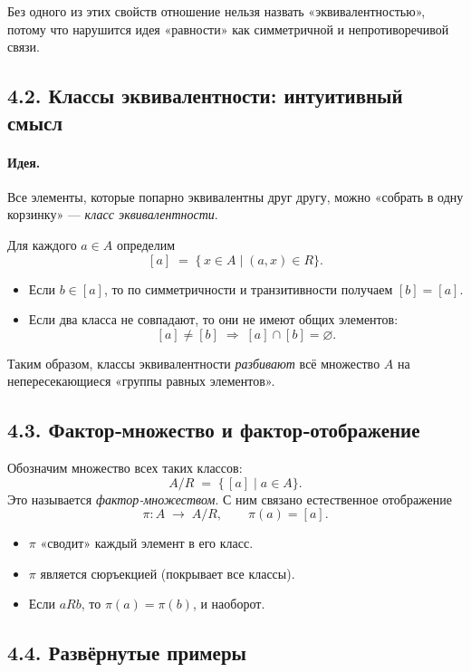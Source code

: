 \documentclass{article}
\begin{document}
Без одного из этих свойств отношение нельзя назвать «эквивалентностью», потому что нарушится идея «равности» как симметричной и непротиворечивой связи.

\subsection*{4.2. Классы эквивалентности: интуитивный смысл}

\paragraph{Идея.} Все элементы, которые попарно эквивалентны друг другу, можно «собрать в одну корзинку» — \emph{класс эквивалентности}.  

Для каждого $a\in A$ определим
\[
  [a] \;=\; \{\,x\in A \mid (a,x)\in R\}.
\]
\begin{itemize}[leftmargin=*]
  \item Если $b\in[a]$, то по симметричности и транзитивности получаем $[b]=[a]$.
  \item Если два класса не совпадают, то они не имеют общих элементов:
    \[
      [a]\neq[b]\;\Longrightarrow\;[a]\cap[b]=\varnothing.
    \]
\end{itemize}

Таким образом, классы эквивалентности \emph{разбивают} всё множество $A$ на непересекающиеся «группы равных элементов».

\subsection*{4.3. Фактор‑множество и фактор‑отображение}

Обозначим множество всех таких классов:
\[
  A/R \;=\; \{\, [a] \mid a\in A\}.
\]
Это называется \emph{фактор‑множеством}.  
С ним связано естественное отображение
\[
  \pi: A \;\longrightarrow\; A/R,\qquad
  \pi(a) = [a].
\]
\begin{itemize}[leftmargin=*]
  \item $\pi$ «сводит» каждый элемент в его класс.
  \item $\pi$ является сюръекцией (покрывает все классы).
  \item Если $aRb$, то $\pi(a)=\pi(b)$, и наоборот.
\end{itemize}

\subsection*{4.4. Развёрнутые примеры}
\end{document}
